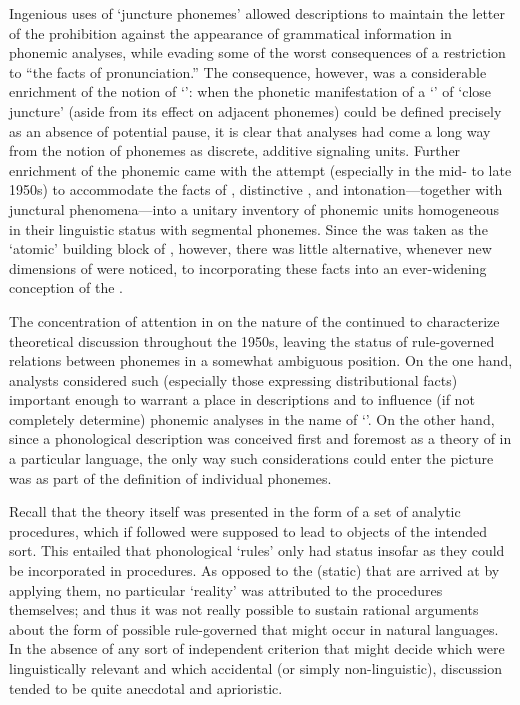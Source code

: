 Ingenious uses of `juncture phonemes' allowed descriptions to maintain
the letter of the prohibition against the appearance of grammatical
information in phonemic analyses, while evading some of the worst
consequences of a restriction to ``the facts of pronunciation.'' The
consequence, however, was a considerable enrichment of the notion of
`': when the phonetic manifestation of a `' of `close
juncture' (aside from its effect on adjacent phonemes) could be
defined precisely as an absence of potential pause, it is clear that
analyses had come a long way from the notion of phonemes as discrete,
additive signaling units. Further enrichment of the phonemic 
came with the attempt (especially in the mid- to late 1950s) to
accommodate the facts of , distinctive , and
intonation—together with junctural phenomena—into a unitary inventory
of phonemic units homogeneous in their linguistic status with
segmental phonemes. Since the  was taken as the `atomic'
building block of , however, there was little alternative,
whenever new dimensions of  were noticed, to incorporating
these facts into an ever-widening conception of the .

The concentration of attention in  on the nature
of the  continued to characterize theoretical discussion
throughout the 1950s, leaving the status of rule-governed relations
between phonemes in a somewhat ambiguous position. On the one hand,
analysts considered such  (especially those expressing
distributional facts) important enough to warrant a place in
descriptions and to influence (if not completely determine) phonemic
analyses in the name of `'. On the other hand, since
a phonological description was conceived first and foremost as a
theory of  in a particular language, the only
way such considerations could enter the picture was as part of the
definition of individual phonemes.

Recall that the theory itself was presented in the form of a set of
analytic procedures, which if followed were supposed to lead to
objects of the intended sort. This entailed that phonological `rules'
only had status insofar as they could be incorporated in
procedures. As opposed to the (static)  that are
arrived at by applying them, no particular `reality' was attributed to
the procedures themselves; and thus it was not really possible to
sustain rational arguments about the form of possible rule-governed
 that might occur in natural languages. In the absence of
any sort of independent criterion that might decide which 
were linguistically relevant and which accidental (or simply
non-linguistic), discussion tended to be quite anecdotal and
aprioristic.


